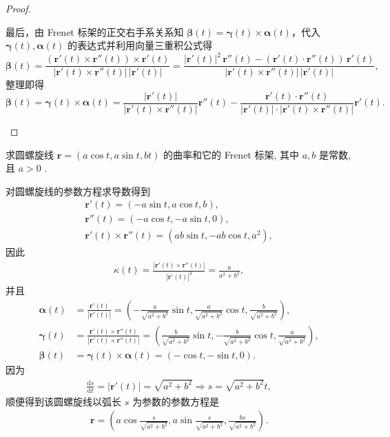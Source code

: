 \documentclass[../../main.tex]{subfiles}%
\begin{document}
\begin{proof}
\begin{enumerate}
\[\]
最后，由 Frenet 标架的正交右手系关系知 $\bm{\beta}(t)=\bm{\gamma}(t)\times\bm{\alpha}(t)$，代入 $\bm{\gamma}(t),\bm{\alpha}(t)$ 的表达式并利用向量三重积公式得
\[
\boldsymbol{\beta }\left( t \right) =\frac{(\boldsymbol{r}'\left( t \right) \times \boldsymbol{r}'' \left( t \right) )\times \boldsymbol{r}'\left( t \right)}{|\boldsymbol{r}'\left( t \right) \times \boldsymbol{r}'' \left( t \right) |\,|\boldsymbol{r}'\left( t \right) |}=\frac{|\boldsymbol{r}'\left( t \right) |^2\,\boldsymbol{r}'' \left( t \right) -(\boldsymbol{r}'\left( t \right) \cdot \boldsymbol{r}'' \left( t \right) )\,\boldsymbol{r}'\left( t \right)}{|\boldsymbol{r}'\left( t \right) \times \boldsymbol{r}'' \left( t \right) |\,|\boldsymbol{r}'\left( t \right) |},
\]
整理即得
\[
\bm{\beta}(t) = \bm{\gamma}(t) \times \bm{\alpha}(t) = \frac{|\bm{r}'(t)|}{|\bm{r}'(t) \times \bm{r}''(t)|}\bm{r}''(t) - \frac{\bm{r}'(t) \cdot \bm{r}''(t)}{|\bm{r}'(t)| \cdot |\bm{r}'(t) \times \bm{r}''(t)|}\bm{r}'(t).
\]
\end{enumerate}

\end{proof}

\begin{example}\label{example:微分几何-例题2.1}
求圆螺旋线 $\bm{r} = (a\cos t, a\sin t, bt)$ 的曲率和它的 Frenet 标架, 其中 $a,b$ 是常数, 且 $a>0$ .
\end{example}
\begin{solution}

对圆螺旋线的参数方程求导数得到
\begin{gather*}
\bm{r}'(t) = (-a\sin t, a\cos t, b), \\
\bm{r}''(t) = (-a\cos t, -a\sin t, 0), \\
\bm{r}'(t) \times \bm{r}''(t) = (ab\sin t, -ab\cos t, a^2),
\end{gather*}
因此
\begin{align*}
\kappa(t) = \frac{|\bm{r}'(t) \times \bm{r}''(t)|}{|\bm{r}'(t)|^3} = \frac{a}{a^2 + b^2},
\end{align*}
并且
\begin{align*}
\bm{\alpha}(t) &= \frac{\bm{r}'(t)}{|\bm{r}'(t)|} = \left(-\frac{a}{\sqrt{a^2 + b^2}}\sin t, \frac{a}{\sqrt{a^2 + b^2}}\cos t, \frac{b}{\sqrt{a^2 + b^2}}\right), \\
\bm{\gamma}(t) &= \frac{\bm{r}'(t) \times \bm{r}''(t)}{|\bm{r}'(t) \times \bm{r}''(t)|} = \left(\frac{b}{\sqrt{a^2 + b^2}}\sin t, -\frac{b}{\sqrt{a^2 + b^2}}\cos t, \frac{a}{\sqrt{a^2 + b^2}}\right), \\
\bm{\beta}(t) &= \bm{\gamma}(t) \times \bm{\alpha}(t) = (-\cos t, -\sin t, 0).
\end{align*}
因为
\begin{align*}
\frac{\mathrm{d}s}{\mathrm{d}t} = |\bm{r}'(t)| = \sqrt{a^2 + b^2}\Longrightarrow s = \sqrt{a^2 + b^2}t,
\end{align*}
顺便得到该圆螺旋线以弧长 $s$ 为参数的参数方程是
\begin{align*}
\bm{r} = \left(a\cos\frac{s}{\sqrt{a^2 + b^2}}, a\sin\frac{s}{\sqrt{a^2 + b^2}}, \frac{bs}{\sqrt{a^2 + b^2}}\right).
\end{align*}

\end{solution}
\end{document}
